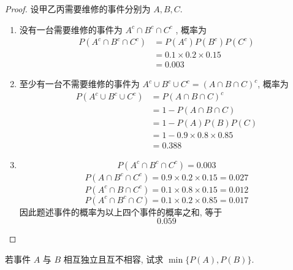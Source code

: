 \documentclass[../main.tex]{subfiles}
\begin{document}
\begin{proof}
    设甲乙丙需要维修的事件分别为 \(  A,B,C  \). 
    \begin{enumerate}
        \item 没有一台需要维修的事件为 \(  A^{c}\cap B^{c}\cap C^{c}  \) , 概率为 \[
        \begin{aligned}
        P\left( A^{c}\cap B^{c}\cap C^{c} \right)&= P\left( A^{c} \right)P\left( B^{c} \right)P\left( C^{c} \right)\\ 
         &= 0.1 \times  0.2 \times  0.15\\ 
          &= 0.003     
        \end{aligned}
        \]
        \item 至少有一台不需要维修的事件为 \(  A^{c}\cup B^{c}\cup C^{c}= \left( A\cap B\cap C \right)^{c}  \), 概率为 \[
        \begin{aligned}
        P\left( A^{c}\cup B^{c}\cup C^{c} \right)&= P\left( A\cap B\cap C \right)^{c}\\ 
         &= 1-P\left( A\cap B\cap C \right)\\ 
          &= 1-P\left( A \right)P\left( B \right)P\left( C \right)\\ 
           &= 1- 0.9 \times  0.8 \times  0.85\\ 
            &= 0.388       
        \end{aligned}
        \] 
        \item  \[
        P\left( A^{c}\cap B^{c}\cap C^{c} \right)= 0.003 
        \] \[
        \begin{aligned}
        P\left( A\cap B^{c}\cap C^{c} \right)= 0.9 \times  0.2 \times  0.15= 0.027  
        \end{aligned}
        \] \[
        P\left( A^{c}\cap B\cap C^{c} \right)= 0.1 \times  0.8 \times  0.15= 0.012 
        \] \[
        P\left( A^{c}\cap B^{c}\cap C \right)= 0.1 \times  0.2 \times  0.85= 0.017 
        \]因此题述事件的概率为以上四个事件的概率之和, 等于 \[
        0.059
        \]
    \end{enumerate}
     
\end{proof}

\begin{exercise}{}{}
若事件 $A$ 与 $B$ 相互独立且互不相容, 试求 $\min\{P(A), P(B)\}$.
\end{exercise}
\end{document}
